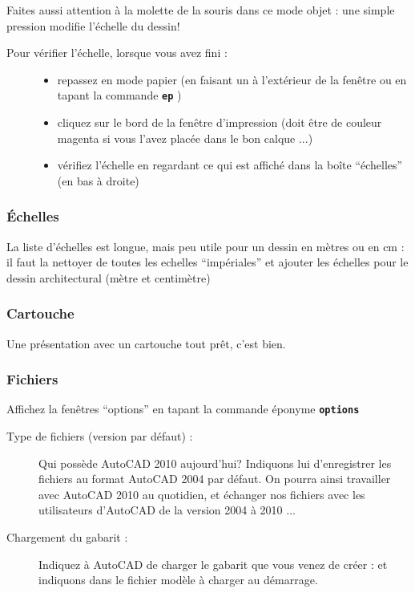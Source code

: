 \documentclass[a4paper,12pt,french]{sphinxmanual}
\begin{document}
Faites aussi attention à la molette de la souris dans ce mode objet : une simple pression modifie l'échelle du dessin!
\begin{description}
\item[{Pour vérifier l'échelle, lorsque vous avez fini :}] \leavevmode\begin{itemize}
\item {} 
repassez en mode papier (en faisant un  à l'extérieur de la fenêtre ou en tapant la commande \textbf{\texttt{ep}} )

\item {} 
cliquez sur le bord de la fenêtre d'impression (doit être de couleur magenta si vous l'avez placée dans le bon calque ...)

\item {} 
vérifiez l'échelle en regardant ce qui est affiché dans la boîte ``échelles'' (en bas à droite)

\end{itemize}

\end{description}


\subsubsection{Échelles}
\label{acad/config_acad:echelles}
La liste d'échelles  est longue, mais peu utile pour un dessin en mètres ou en cm : il faut la nettoyer de toutes les echelles ``impériales'' et ajouter les échelles pour le dessin architectural (mètre et centimètre)


\subsubsection{Cartouche}
\label{acad/config_acad:cartouche}
Une présentation avec un cartouche tout prêt, c'est bien.


\subsubsection{Fichiers}
\label{acad/config_acad:fichiers}
Affichez la fenêtres ``options'' en tapant la commande éponyme \textbf{\texttt{options}}
\begin{description}
\item[{Type de fichiers (version par défaut) :}] \leavevmode
Qui possède AutoCAD 2010 aujourd'hui? Indiquons lui d'enregistrer les fichiers au format AutoCAD 2004 par défaut. On pourra ainsi travailler avec AutoCAD 2010 au quotidien, et échanger nos fichiers avec les utilisateurs d'AutoCAD de la version 2004 à 2010 ...

\end{description}
\label{acad/config_acad:chrgt-gabarit}\begin{description}
\item[{Chargement du gabarit :}] \leavevmode
Indiquez à AutoCAD de charger le gabarit que vous venez de créer :  et indiquons dans  le fichier modèle à charger au démarrage.

\end{description}
\end{document}
